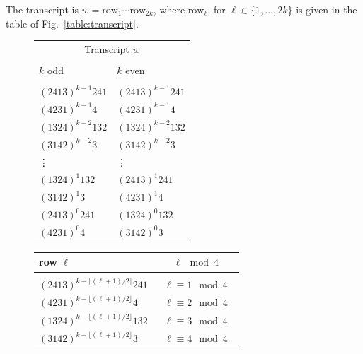 The transcript is $w=\mathrm{row}_1\cdots \mathrm{row}_{2k}$, where $\mathrm{row}_\ell$, for $\ell\in \{1,\dots, 2k\}$ is given in the table of Fig.~\ref{table:transcript}.
\begin{figure}[h]
	\begin{minipage}{.49\textwidth}
		\begin{tabular}{l|l}
			\multicolumn{2}{c}{Transcript $w$}\\
			\multicolumn{2}{c}{}  \\
			$k$ odd & \hspace{0.3cm} $k$ even\\\hline
			& \\
			$(2413)^{k-1}241$\hspace{0.3cm} & \hspace{0.3cm} $(2413)^{k-1}241$\\
			$(4231)^{k-1}4$   &  \hspace{0.3cm} $(4231)^{k-1}4$  \\
			$(1324)^{k-2}132$ &  \hspace{0.3cm} $(1324)^{k-2}132$\\
			$(3142)^{k-2}3$   &  \hspace{0.3cm} $(3142)^{k-2}3$ \\
			\vdots			 &  \hspace{0.3cm} \vdots\\
			$(1324)^1 132$	 &  \hspace{0.3cm} $(2413)^{1} 241$\\
			$(3142)^1 3$		 & \hspace{0.3cm} $(4231)^1 4$\\
			$(2413)^0 241$	 &  \hspace{0.3cm} $(1324)^0 132$\\
			$(4231)^0 4$		 & \hspace{0.3cm} $(3142)^0 3$\\
		\end{tabular}
	\end{minipage}
	\begin{minipage}{.49\textwidth}
		\begin{tabular}{|l|c|}
			\hline
			\hspace{1.2cm}row $\ell$ & $\ell\mod 4$ \\\hline
			 & \\
			\hspace{0.1cm}$(2413)^{k-\lfloor (\ell+1)/2\rfloor}241$ \hspace{0.1cm} &  $\textrm{ }\ell\equiv 1\mod 4\textrm{ }$\\
			\hspace{0.1cm}$(4231)^{k-\lfloor (\ell+1)/2\rfloor}4$   &  $\textrm{ }\ell\equiv 2 \mod 4\textrm{ }$ \\
			\hspace{0.1cm}$(1324)^{k-\lfloor (\ell+1)/2\rfloor}132$ &  $\textrm{ }\ell\equiv 3 \mod 4\textrm{ }$ \\
			\hspace{0.1cm}$(3142)^{k-\lfloor (\ell+1)/2\rfloor}3$   &  $\textrm{ }\ell\equiv 4 \mod 4\textrm{ }$ \\\hline
		\end{tabular}
	

\end{minipage}
\end{figure}
